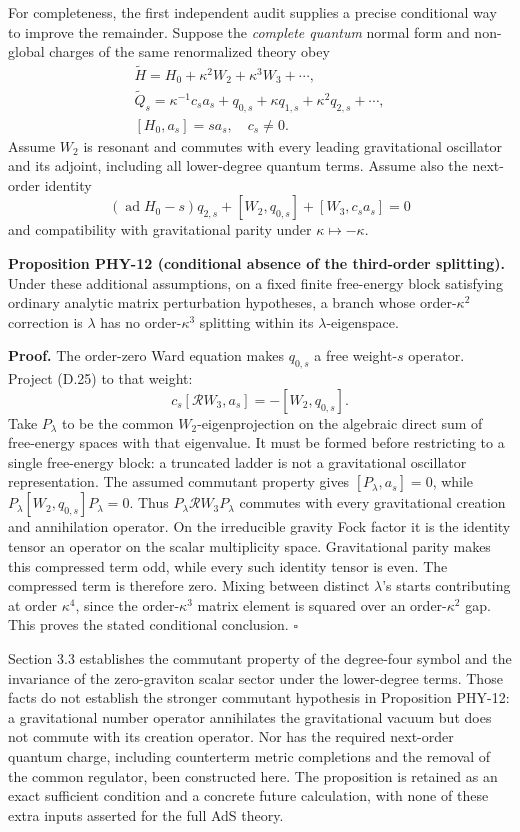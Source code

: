 \documentclass[a4paper,11pt]{article}
\numberwithin{equation}{section}
\begin{document}
For completeness, the first independent audit supplies a precise conditional way to improve the remainder. Suppose the \emph{complete quantum} normal form and non-global charges of the same renormalized theory obey \[
\begin{gathered}
\widetilde H=H_0+\kappa^2W_2+\kappa^3W_3+\cdots,\\
\widetilde Q_s=\kappa^{-1}c_sa_s+q_{0,s}+\kappa q_{1,s}
+\kappa^2q_{2,s}+\cdots,\\
[H_0,a_s]=sa_s,\quad c_s\ne0 .
\end{gathered}
\tag{D.24}
\] Assume \(W_2\) is resonant and commutes with every leading gravitational oscillator and its adjoint, including all lower-degree quantum terms. Assume also the next-order identity \[
(\operatorname{ad}H_0-s)q_{2,s}
+[W_2,q_{0,s}]+[W_3,c_sa_s]=0
\tag{D.25}
\] and compatibility with gravitational parity under \(\kappa\mapsto-\kappa\).

\textbf{Proposition PHY-12 (conditional absence of the third-order splitting).} Under these additional assumptions, on a fixed finite free-energy block satisfying ordinary analytic matrix perturbation hypotheses, a branch whose order-\(\kappa^2\) correction is \(\lambda\) has no order-\(\kappa^3\) splitting within its \(\lambda\)-eigenspace.

\textbf{Proof.} The order-zero Ward equation makes \(q_{0,s}\) a free weight-\(s\) operator. Project (D.25) to that weight: \[
c_s[\mathcal RW_3,a_s]=-[W_2,q_{0,s}].
\tag{D.26}
\] Take \(P_\lambda\) to be the common \(W_2\)-eigenprojection on the algebraic direct sum of free-energy spaces with that eigenvalue. It must be formed before restricting to a single free-energy block: a truncated ladder is not a gravitational oscillator representation. The assumed commutant property gives \([P_\lambda,a_s]=0\), while \(P_\lambda[W_2,q_{0,s}]P_\lambda=0\). Thus \(P_\lambda\mathcal RW_3P_\lambda\) commutes with every gravitational creation and annihilation operator. On the irreducible gravity Fock factor it is the identity tensor an operator on the scalar multiplicity space. Gravitational parity makes this compressed term odd, while every such identity tensor is even. The compressed term is therefore zero. Mixing between distinct \(\lambda\)'s starts contributing at order \(\kappa^4\), since the order-\(\kappa^3\) matrix element is squared over an order-\(\kappa^2\) gap. This proves the stated conditional conclusion. \(\square\)

Section 3.3 establishes the commutant property of the degree-four symbol and the invariance of the zero-graviton scalar sector under the lower-degree terms. Those facts do not establish the stronger commutant hypothesis in Proposition PHY-12: a gravitational number operator annihilates the gravitational vacuum but does not commute with its creation operator. Nor has the required next-order quantum charge, including counterterm metric completions and the removal of the common regulator, been constructed here. The proposition is retained as an exact sufficient condition and a concrete future calculation, with none of these extra inputs asserted for the full AdS theory.
\end{document}
